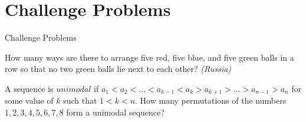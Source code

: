 \documentclass[9pt]{beamer}
\begin{document}
\section{Challenge Problems}
\begin{frame}
    \begin{alertblock}{}
        \begin{flushright}
        {\huge Challenge Problems}
        \end{flushright}
    \end{alertblock}
\end{frame}
\begin{frame}[t]{7.1}
\begin{block}{}
     How many ways are there to arrange five red, five blue, and five green balls in a row so that no two green balls lie next to each other? \textit{(Russia)}
\end{block}
\end{frame}
\begin{frame}[t]{7.2}
\begin{block}{}
     A sequence is $\textit{unimodal}$ if $a_1 < a_2 < \ldots < a_{k - 1} < a_k > a_{k + 1} > \ldots > a_{n - 1} > a_n$ for some value of $k$ such that $1 < k < n$. How many permutations of the numbers $1, 2, 3, 4, 5, 6, 7, 8$ form a unimodal sequence?
\end{block}
\end{frame}
\end{document}
